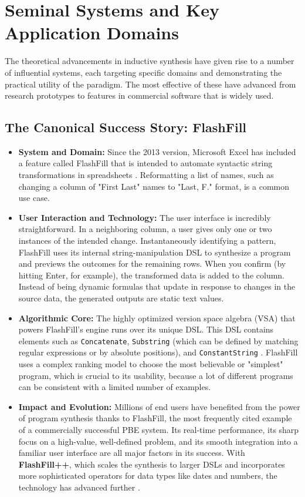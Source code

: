 \documentclass[12pt, a4paper]{report}
\begin{document}
\section{Seminal Systems and Key Application Domains}

The theoretical advancements in inductive synthesis have given rise to a number of influential systems, each targeting specific domains and demonstrating the practical utility of the paradigm. The most effective of these have advanced from research prototypes to features in commercial software that is widely used.

\subsection{The Canonical Success Story: FlashFill}

\begin{itemize}
    \item \textbf{System and Domain:} Since the 2013 version, Microsoft Excel has included a feature called FlashFill that is intended to automate syntactic string transformations in spreadsheets \citep{gulwani2011automating}. Reformatting a list of names, such as changing a column of "First Last" names to "Last, F." format, is a common use case.
    \item \textbf{User Interaction and Technology:} The user interface is incredibly straightforward. In a neighboring column, a user gives only one or two instances of the intended change. Instantaneously identifying a pattern, FlashFill uses its internal string-manipulation DSL to synthesize a program and previews the outcomes for the remaining rows. When you confirm (by hitting Enter, for example), the transformed data is added to the column. Instead of being dynamic formulas that update in response to changes in the source data, the generated outputs are static text values.
    \item \textbf{Algorithmic Core:} The highly optimized version space algebra (VSA) that powers FlashFill's engine runs over its unique DSL. This DSL contains elements such as \texttt{Concatenate}, \texttt{Substring} (which can be defined by matching regular expressions or by absolute positions), and \texttt{ConstantString} \citep{gulwani2012dimensions}. FlashFill uses a complex ranking model to choose the most believable or "simplest" program, which is crucial to its usability, because a lot of different programs can be consistent with a limited number of examples.
    \item \textbf{Impact and Evolution:} Millions of end users have benefited from the power of program synthesis thanks to FlashFill, the most frequently cited example of a commercially successful PBE system. Its real-time performance, its sharp focus on a high-value, well-defined problem, and its smooth integration into a familiar user interface are all major factors in its success. With \textbf{FlashFill++}, which scales the synthesis to larger DSLs and incorporates more sophisticated operators for data types like dates and numbers, the technology has advanced further \citep{singh2016automated}.
\end{itemize}
\end{document}
